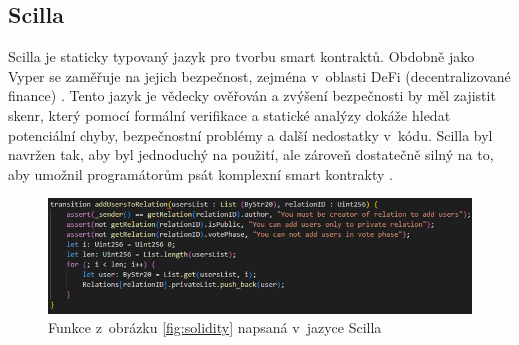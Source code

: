 \subsection*{Scilla}
Scilla je staticky typovaný jazyk pro tvorbu smart kontraktů. Obdobně jako Vyper se zaměřuje na jejich bezpečnost, zejména v~oblasti DeFi (decentralizované finance) \cite{scilla1}. Tento jazyk je vědecky ověřován a zvýšení bezpečnosti by měl zajistit skenr, který pomocí formální verifikace a statické analýzy dokáže hledat potenciální chyby, bezpečnostní problémy a další nedostatky v~kódu. Scilla byl navržen tak, aby byl jednoduchý na použití, ale zároveň dostatečně silný na to, aby umožnil programátorům psát komplexní smart kontrakty \cite{scilla2}.
\begin{figure}
\centering
\includegraphics[width=\textwidth]{obrazky/Scilla.png}
\caption{Funkce z~obrázku \ref{fig:solidity} napsaná v~jazyce Scilla}
\centering
\end{figure}

